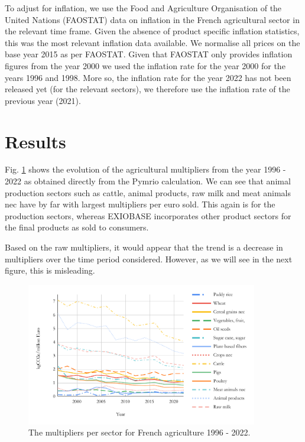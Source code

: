\documentclass[a4paper,twoside]{article}
\begin{document}
To adjust for inflation, we use the Food and Agriculture Organisation of the United Nations (FAOSTAT) data on inflation in the French agricultural sector in the relevant time frame. Given the absence of product specific inflation statistics, this was the most relevant inflation data available. We normalise all prices on the base year 2015 as per FAOSTAT. Given that FAOSTAT only provides inflation figures from the year 2000 we used the inflation rate for the year 2000 for the years 1996 and 1998. More so, the inflation rate for the year 2022 has not been released yet (for the relevant sectors), we therefore use the inflation rate of the previous year (2021).

\section{Results}

Fig. \ref{fig:rawmultipliers} shows the evolution of the agricultural multipliers from the year 1996 - 2022 as obtained directly from the Pymrio calculation. We can see that animal production sectors such as cattle, animal products, raw milk and meat animals nec have by far with largest multipliers per euro sold. This again is for the production sectors, whereas EXIOBASE incorporates other product sectors for the final products as sold to consumers.

Based on the raw multipliers, it would appear that the trend is a decrease in multipliers over the time period considered. However, as we will see in the next figure, this is misleading.

\begin{figure}[H]
\centering
\includegraphics[width=0.9\textwidth]{raw_multipliers}
\caption{The multipliers per sector for French agriculture 1996 - 2022.}\label{fig:rawmultipliers} 
\end{figure}
\end{document}

